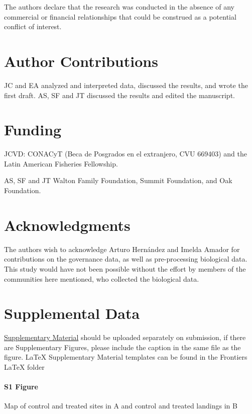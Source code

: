 \documentclass{frontiersSCNS}
\begin{document}
The authors declare that the research was conducted in the absence of
any commercial or financial relationships that could be construed as a
potential conflict of interest.

\section*{Author Contributions}

JC and EA analyzed and interpreted data, discussed the results, and
wrote the first draft. AS, SF and JT discussed the results and edited
the manuscript.

\section*{Funding}

JCVD: CONACyT (Beca de Posgrados en el extranjero, CVU 669403) and the
Latin American Fisheries Fellowship.

AS, SF and JT Walton Family Foundation, Summit Foundation, and Oak
Foundation.

\section*{Acknowledgments}

The authors wish to acknowledge Arturo Hernández and Imelda Amador for
contributions on the governance data, as well as pre-processing
biological data. This study would have not been possible without the
effort by members of the communities here mentioned, who collected the
biological data.

\section*{Supplemental Data}

\href{http://home.frontiersin.org/about/author-guidelines#SupplementaryMaterial}{Supplementary Material}
should be uploaded separately on submission, if there are Supplementary
Figures, please include the caption in the same file as the figure.
LaTeX Supplementary Material templates can be found in the Frontiers
LaTeX folder

\paragraph*{S1 Figure}
\label{S1_Figure}

Map of control and treated sites in A and control and treated landings
in B
\end{document}
